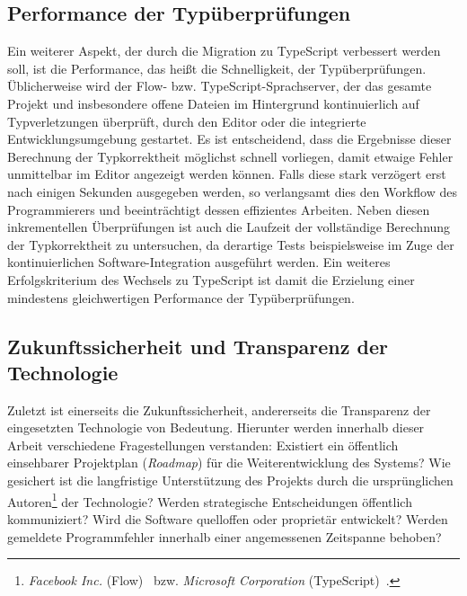 \subsection{Performance der Typüberprüfungen}

Ein weiterer Aspekt, der durch die Migration zu TypeScript verbessert werden soll, ist die Performance, das heißt die Schnelligkeit, der Typüberprüfungen. Üblicherweise wird der Flow- bzw. TypeScript-Sprachserver, der das gesamte Projekt und insbesondere offene Dateien im Hintergrund kontinuierlich auf Typverletzungen überprüft, durch den Editor oder die integrierte Entwicklungsumgebung gestartet. Es ist entscheidend, dass die Ergebnisse dieser Berechnung der Typkorrektheit möglichst schnell vorliegen, damit etwaige Fehler unmittelbar im Editor angezeigt werden können. Falls diese stark verzögert erst nach einigen Sekunden ausgegeben werden, so verlangsamt dies den Workflow des Programmierers und beeinträchtigt dessen effizientes Arbeiten. Neben diesen inkrementellen Überprüfungen ist auch die Laufzeit der vollständige Berechnung der Typkorrektheit zu untersuchen, da derartige Tests beispielsweise im Zuge der kontinuierlichen Software-Integration ausgeführt werden. Ein weiteres Erfolgskriterium des Wechsels zu TypeScript ist damit die Erzielung einer mindestens gleichwertigen Performance der Typüberprüfungen.

\subsection{Zukunftssicherheit und Transparenz der Technologie}
\label{sec:goal:transparency}

Zuletzt ist einerseits die Zukunftssicherheit, andererseits die Transparenz der eingesetzten Technologie von Bedeutung. Hierunter werden innerhalb dieser Arbeit verschiedene Fragestellungen verstanden: Existiert ein öffentlich einsehbarer Projektplan (\textit{Roadmap}) für die Weiterentwicklung des Systems? Wie gesichert ist die langfristige Unterstützung des Projekts durch die ursprünglichen Autoren\footnote{\textit{Facebook Inc.} (Flow)~\autocite{FLOW:PAPER} bzw. \emph{Microsoft Corporation} (TypeScript)~\autocite{TYPESCRIPT:SPEC}.} der Technologie? Werden strategische Entscheidungen öffentlich kommuniziert? Wird die Software quelloffen oder proprietär entwickelt? Werden gemeldete Programmfehler innerhalb einer angemessenen Zeitspanne behoben?

